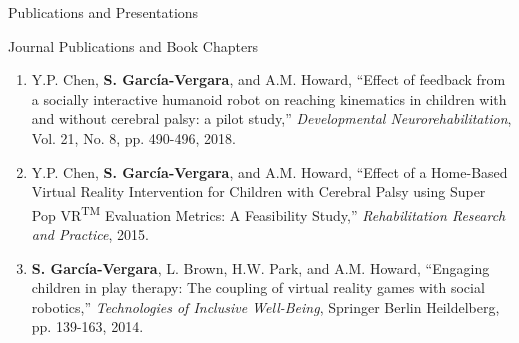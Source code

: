 \documentclass{resume} %
\newcommand{\sectionspace}{\vspace{3mm}}
\newcommand{\Sergio}{\textbf{S. Garc\'{i}a-Vergara}}
\newcommand{\SuperPop}{Super Pop VR\textsuperscript{TM}\space}
\newcommand{\fixme}{\textcolor{red}{\textbf{fix me}} \space}
\newcommand{\attention}[1]{\noindent \fixme \textcolor{red}{#1}}
\begin{document}

\sectionspace
\begin{rSection}{Publications and Presentations}

\iffalse
\begin{rSubsection}{In Preparation}{}{}{}
\item
\begin{enumerate}

\item \Sergio, Y.P. Chen, and A.M. Howard, ``Instance- versus Individual-based
  Upper-body Movement Classification for Ground Truth Movement Baseline
  Selection,'' \attention{where to publish?}

\item \Sergio, Y.P. Chen, and A.M. Howard, ``Algorithms for computing
  upper-extremity reaching kinematics,'' \textit{IEEE Transactions on Neural
    Systems and Rehabilitation Engineering}, 2017.

\end{enumerate}
\end{rSubsection}
\fi



\sectionspace
\begin{rSubsection}{Journal Publications and Book Chapters}{}{}{}
\item
\begin{enumerate}

\item Y.P. Chen, \Sergio, and A.M. Howard, ``Effect of feedback from a socially
  interactive humanoid robot on reaching kinematics in children with and without
  cerebral palsy: a pilot study,'' \textit{Developmental Neurorehabilitation},
  Vol. 21, No. 8, pp. 490-496, 2018.

\item Y.P. Chen, \Sergio, and A.M. Howard, ``Effect of a Home-Based Virtual
  Reality Intervention for Children with Cerebral Palsy using \SuperPop
  Evaluation Metrics: A Feasibility Study,'' \textit{Rehabilitation Research and
    Practice}, 2015.

\item \Sergio, L. Brown, H.W. Park, and A.M. Howard, ``Engaging children in play
  therapy: The coupling of virtual reality games with social robotics,''
  \textit{Technologies of Inclusive Well-Being}, Springer Berlin Heildelberg,
  pp. 139-163, 2014.
\end{enumerate}
\end{rSubsection}




\end{rSection}
\end{document}

